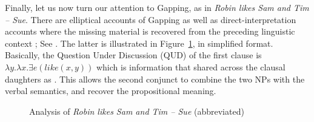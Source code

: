 \documentclass[output=paper]{langsci/langscibook}
\begin{document}
Finally, let us now turn our attention to Gapping, as in 
\emph{Robin likes Sam and Tim -- Sue}.
There are elliptical accounts of Gapping  \citep{chaves06} as well as direct-interpretation accounts where the missing material is recovered from the preceding linguistic context  \citep{mouret, Mouret:06,Abeille:Blbie:Mouret:14,sangheepark}; See . The latter is illustrated in Figure~\ref{gfig}, in simplified format. Basically, the Question Under Discussion (QUD) of the first clause is $\lambda y.\lambda x. \exists e(like(x,y))$ which is information that shared across the clausal daughters as .
This allows the second conjunct to combine the two NPs with the verbal semantics, and recover the propositional meaning.


\begin{figure}
\oneline{%
\begin{forest}
[S\ms{
      qud     & \ibox{1}\\
      content & \menge{ $\exists e'(like(robin,sam)) \wedge \exists e(like(tim,sue))$ }\\
     } 
 [S\ms{  qud & \ibox{1}\\
         content & \menge{ \ibox{0} $\exists e'(like(robin,sam))$ } %
      } ]
 [S\ms{ qud & \ibox{1}\\
          content & \menge{ \ibox{0} $\wedge \exists e(like(tim,sue))$ }
        }
 [Conj [and]]
 [S\ms{ qud & \ibox{1} \menge{ $\lambda y. \lambda x. \exists e(like(x,y))$ }\\
        content & \menge{ $\exists e(like(t,s))$ } } 
   [NP\ms{ content & \menge{ $tim$ }}]
   [NP\ms{ content & \menge{ $sue$ }}] ]
]]
\end{forest}
}
\caption{Analysis of \emph{Robin likes Sam and Tim -- Sue} (abbreviated)}\label{gfig}
\end{figure}
\end{document}
